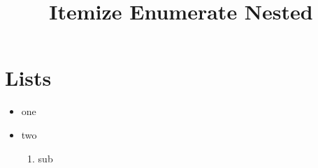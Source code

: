 \documentclass{article}
\begin{document}
\title{Itemize Enumerate Nested}\maketitle
\section{Lists}\begin{itemize}\item one\item two\begin{enumerate}\item sub\end{enumerate}\end{itemize}
\end{document}
